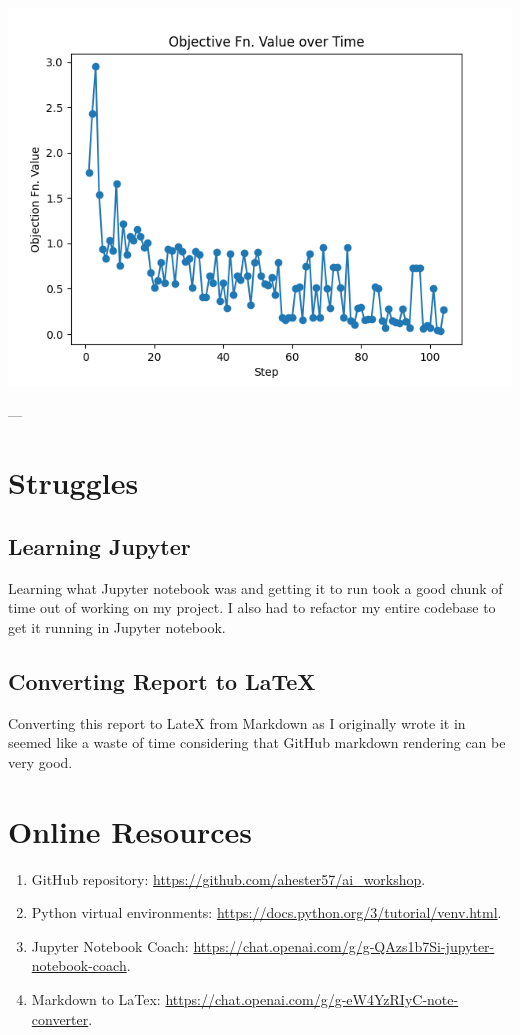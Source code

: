 \documentclass{article}
\begin{document}
\includegraphics[width=6in]{_static/Figure_10_Temp=1.22_Obj-Fn-over-Time.png}

---

\section{Struggles}

\subsection{Learning Jupyter}

Learning what Jupyter notebook was and getting it to run took a good chunk of 
time out of working on my project. I also had to refactor my entire codebase 
to get it running in Jupyter notebook.

\subsection{Converting Report to LaTeX}

Converting this report to LateX from Markdown as I originally wrote it in
seemed like a waste of time considering that GitHub markdown rendering can 
be very good.

\section{Online Resources}

\begin{enumerate}
    \item GitHub repository: \url{https://github.com/ahester57/ai_workshop}.
    \item Python virtual environments: \url{https://docs.python.org/3/tutorial/venv.html}.
    \item Jupyter Notebook Coach: \url{https://chat.openai.com/g/g-QAzs1b7Si-jupyter-notebook-coach}.
    \item Markdown to LaTex: \url{https://chat.openai.com/g/g-eW4YzRIyC-note-converter}.
\end{enumerate}
\end{document}
